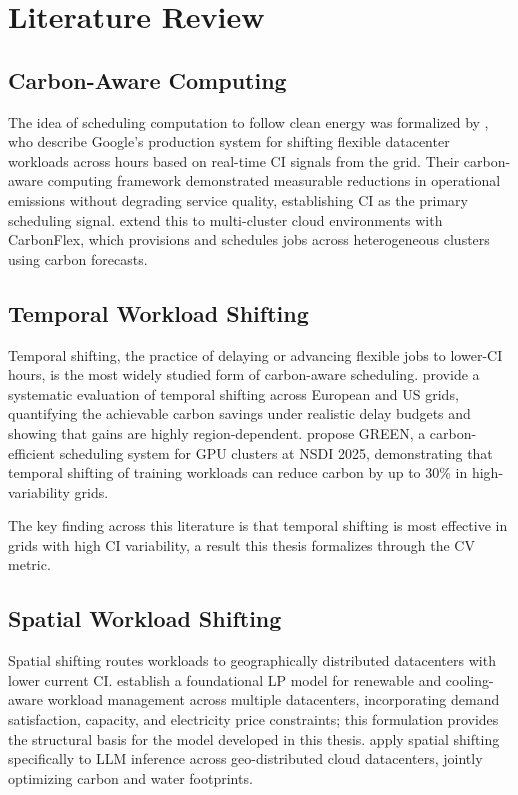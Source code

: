 \section{Literature Review}
\label{sec:literature}

\subsection{Carbon-Aware Computing}

The idea of scheduling computation to follow clean energy was formalized by \citet{radovanovic2023}, who describe Google's production system for shifting flexible datacenter workloads across hours based on real-time CI signals from the grid.
Their carbon-aware computing framework demonstrated measurable reductions in operational emissions without degrading service quality, establishing CI as the primary scheduling signal.
\citet{hanafy2025} extend this to multi-cluster cloud environments with CarbonFlex, which provisions and schedules jobs across heterogeneous clusters using carbon forecasts.

\subsection{Temporal Workload Shifting}

Temporal shifting, the practice of delaying or advancing flexible jobs to lower-CI hours, is the most widely studied form of carbon-aware scheduling.
\citet{wiesner2024limitations} provide a systematic evaluation of temporal shifting across European and US grids, quantifying the achievable carbon savings under realistic delay budgets and showing that gains are highly region-dependent.
\citet{xu2025green} propose GREEN, a carbon-efficient scheduling system for GPU clusters at NSDI 2025, demonstrating that temporal shifting of training workloads can reduce carbon by up to 30\% in high-variability grids.

The key finding across this literature is that temporal shifting is most effective in grids with high CI variability, a result this thesis formalizes through the CV metric.

\subsection{Spatial Workload Shifting}

Spatial shifting routes workloads to geographically distributed datacenters with lower current CI.
\citet{liu2012} establish a foundational LP model for renewable and cooling-aware workload management across multiple datacenters, incorporating demand satisfaction, capacity, and electricity price constraints; this formulation provides the structural basis for the model developed in this thesis.
\citet{li2025llm} apply spatial shifting specifically to LLM inference across geo-distributed cloud datacenters, jointly optimizing carbon and water footprints.

